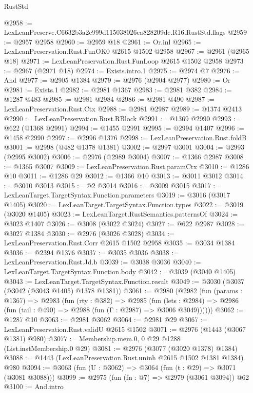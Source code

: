 \begin{lexlean}{RustStd}
\begin{coremodule}
@2958 := LexLeanPreserve.C6632b3a2e999d115038026ca828209de.R16.RustStd.flags
@2959 := @2957 @2958
@2960 := @2959 @18
@2961 := Or.inl
@2965 := LexLeanPreservation.Rust.FunOK0 @2615 @1502 @2958
@2967 := @2961 (@2965 @18)
@2971 := LexLeanPreservation.Rust.FunLoop @2615 @1502 @2958
@2973 := @2967 (@2971 @18)
@2974 := Exists.intro.{1}
@2975 := @2974 @7
@2976 := And
@2977 := @2905 @1384
@2979 := @2976 (@2904 @2977)
@2980 := Or
@2981 := Exists.{1}
@2982 := @2981 @1367
@2983 := @2981 @382
@2984 := @1287 @483
@2985 := @2981 @2984
@2986 := @2981 @490
@2987 := LexLeanPreservation.Rust.Ctx
@2988 := @2981 @2987
@2989 := @1374 @2413
@2990 := LexLeanPreservation.Rust.RBlock
@2991 := @1369 @2990
@2993 := @622 (@1368 @2991)
@2994 := @1455 @2991
@2995 := @2994 @1407
@2996 := @1458 @2990
@2997 := @2996 @1376
@2998 := LexLeanPreservation.Rust.foldB
@3001 := @2998 (@482 @1378 @1381)
@3002 := @2997 @3001
@3004 := @2993 (@2995 @3002)
@3006 := @2976 (@2989 @3004)
@3007 := @1366 @2987
@3008 := @1365 @3007
@3009 := LexLeanPreservation.Rust.paramCtx
@3010 := @1286 @10
@3011 := @1286 @29
@3012 := @1366 @10
@3013 := @3011 @3012
@3014 := @3010 @3013
@3015 := @2 @3014
@3016 := @3009 @3015
@3017 := LexLeanTarget.TargetSyntax.Function.parameters
@3019 := @3016 (@3017 @1405)
@3020 := LexLeanTarget.TargetSyntax.Function.types
@3022 := @3019 (@3020 @1405)
@3023 := LexLeanTarget.RustSemantics.patternsOf
@3024 := @3023 @1407
@3026 := @3008 (@3022 @3024)
@3027 := @622 @2987
@3028 := @3027 @1384
@3030 := @2976 (@3026 @3028)
@3034 := LexLeanPreservation.Rust.Corr @2615 @1502 @2958
@3035 := @3034 @1384
@3036 := @2394 @1376
@3037 := @3035 @3036
@3038 := LexLeanPreservation.Rust.Jd.b
@3039 := @3038 @3036
@3040 := LexLeanTarget.TargetSyntax.Function.body
@3042 := @3039 (@3040 @1405)
@3043 := LexLeanTarget.TargetSyntax.Function.result
@3049 := @3030 (@3037 (@3042 (@3043 @1405) @1378 @1381))
@3061 := @2980
    (@2982
      (fun (params : @1367) =>
      @2983
        (fun (rty : @382) =>
        @2985
          (fun (lets : @2984) =>
          @2986 (fun (tail : @490) => @2988 (fun (Γ : @2987) => @3006 @3049))))))
@3062 := @1287 @10
@3063 := @2981 @3062
@3064 := @2981 @29
@3067 := LexLeanPreservation.Rust.validU @2615 @1502
@3071 := @2976 (@1443 (@3067 @1381) @980)
@3077 := Membership.mem.{0, 0} @29 @1288 (List.instMembership.{0} @29)
@3081 := @2976 (@3077 (@3020 @1378) @1384)
@3088 := @1443 (LexLeanPreservation.Rust.uninh @2615 @1502 @1381 @1384) @980
@3094 := @3063 (fun (U : @3062) => @3064 (fun (t : @29) => @3071 (@3081 @3088)))
@3099 := @2975 (fun (fn : @7) => @2979 (@3061 @3094)) @62
@3100 := And.intro

\end{coremodule}
\end{lexlean}
